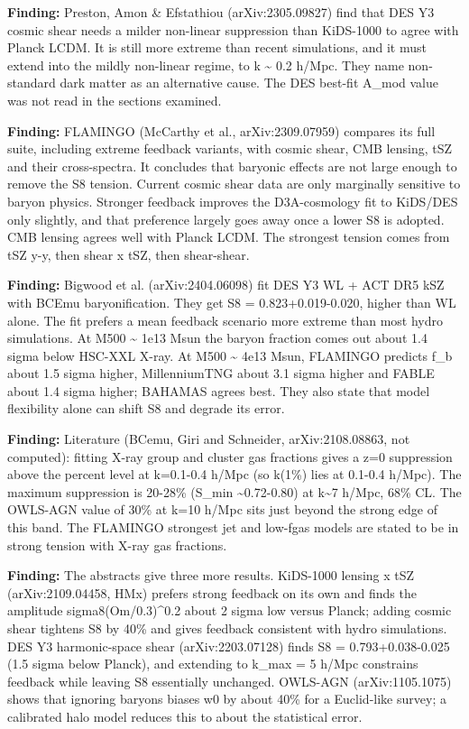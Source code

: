 \documentclass[11pt,a4paper]{article}
\begin{document}
\textbf{Finding:} Preston, Amon \& Efstathiou (arXiv:2305.09827) find that DES Y3 cosmic shear needs a milder non-linear suppression than KiDS-1000 to agree with Planck LCDM. It is still more extreme than recent simulations, and it must extend into the mildly non-linear regime, to k \textasciitilde{} 0.2 h/Mpc. They name non-standard dark matter as an alternative cause. The DES best-fit A\_mod value was not read in the sections examined.

\textbf{Finding:} FLAMINGO (McCarthy et al., arXiv:2309.07959) compares its full suite, including extreme feedback variants, with cosmic shear, CMB lensing, tSZ and their cross-spectra. It concludes that baryonic effects are not large enough to remove the S8 tension. Current cosmic shear data are only marginally sensitive to baryon physics. Stronger feedback improves the D3A-cosmology fit to KiDS/DES only slightly, and that preference largely goes away once a lower S8 is adopted. CMB lensing agrees well with Planck LCDM. The strongest tension comes from tSZ y-y, then shear x tSZ, then shear-shear.

\textbf{Finding:} Bigwood et al. (arXiv:2404.06098) fit DES Y3 WL + ACT DR5 kSZ with BCEmu baryonification. They get S8 = 0.823+0.019-0.020, higher than WL alone. The fit prefers a mean feedback scenario more extreme than most hydro simulations. At M500 \textasciitilde{} 1e13 Msun the baryon fraction comes out about 1.4 sigma below HSC-XXL X-ray. At M500 \textasciitilde{} 4e13 Msun, FLAMINGO predicts f\_b about 1.5 sigma higher, MillenniumTNG about 3.1 sigma higher and FABLE about 1.4 sigma higher; BAHAMAS agrees best. They also state that model flexibility alone can shift S8 and degrade its error.

\textbf{Finding:} Literature (BCemu, Giri and Schneider, arXiv:2108.08863, not computed): fitting X-ray group and cluster gas fractions gives a z=0 suppression above the percent level at k=0.1-0.4 h/Mpc (so k(1\%) lies at 0.1-0.4 h/Mpc). The maximum suppression is 20-28\% (S\_min \textasciitilde{}0.72-0.80) at k\textasciitilde{}7 h/Mpc, 68\% CL. The OWLS-AGN value of 30\% at k=10 h/Mpc sits just beyond the strong edge of this band. The FLAMINGO strongest jet and low-fgas models are stated to be in strong tension with X-ray gas fractions.

\textbf{Finding:} The abstracts give three more results. KiDS-1000 lensing x tSZ (arXiv:2109.04458, HMx) prefers strong feedback on its own and finds the amplitude sigma8(Om/0.3)\textasciicircum{}0.2 about 2 sigma low versus Planck; adding cosmic shear tightens S8 by 40\% and gives feedback consistent with hydro simulations. DES Y3 harmonic-space shear (arXiv:2203.07128) finds S8 = 0.793+0.038-0.025 (1.5 sigma below Planck), and extending to k\_max = 5 h/Mpc constrains feedback while leaving S8 essentially unchanged. OWLS-AGN (arXiv:1105.1075) shows that ignoring baryons biases w0 by about 40\% for a Euclid-like survey; a calibrated halo model reduces this to about the statistical error.
\end{document}
